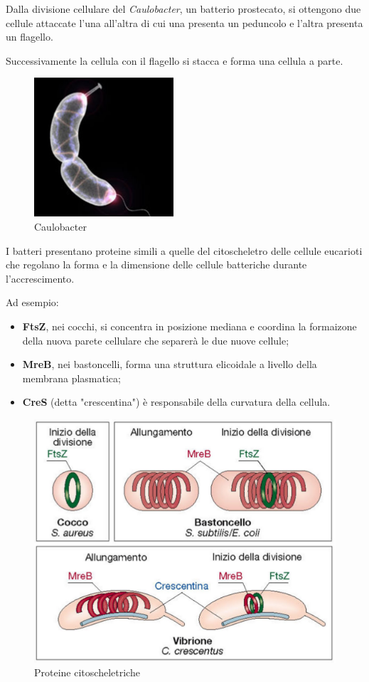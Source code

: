 \documentclass[11pt]{book}
\begin{document}
\vspace{1em}
Dalla divisione cellulare del \emph{Caulobacter}, un batterio prostecato, si ottengono due cellule attaccate l'una all'altra di cui una presenta un peduncolo e l'altra presenta un flagello. 

Successivamente la cellula con il flagello si stacca e forma una cellula a parte.

\begin{figure}[htp]
\centering
\includegraphics[scale=0.5]{img/Caulobacter.png}
\caption{Caulobacter}
\label{}
\end{figure}

\clearpage
I batteri presentano proteine simili a quelle del citoscheletro delle cellule eucarioti che regolano la forma e la dimensione delle cellule batteriche durante l'accrescimento.

Ad esempio:
\begin{itemize}
\item \textbf{FtsZ}, nei cocchi, si concentra in posizione mediana e coordina la formaizone della nuova parete cellulare che separerà le due nuove cellule;
\item \textbf{MreB}, nei bastoncelli, forma una struttura elicoidale a livello della membrana plasmatica;
\item \textbf{CreS} (detta "crescentina") è responsabile della curvatura della cellula.
\end{itemize}

\begin{figure}[htp]
\centering
\includegraphics[scale=0.5]{img/Proteine citoscheletriche.png}
\caption{Proteine citoscheletriche}
\label{}
\end{figure}
\end{document}
